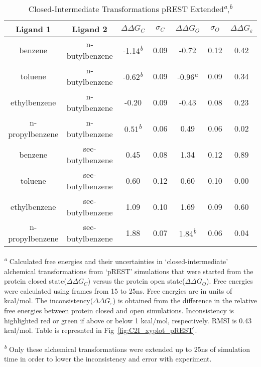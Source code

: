 \begin{table}[!htb]
\centering
\caption{Closed-Intermediate Transformations pREST Extended\textsuperscript{\emph{a}},\textsuperscript{\emph{b}}}
\label{tbl:C-I_pRESText}
\begin{tabular}{|c|c|c|c|c|c|c|}
\hline
\textbf{Ligand 1}       & \textbf{Ligand 2}    & \boldmath$\Delta\Delta G_{C}$ & \boldmath$\sigma_{C}$ & \boldmath$\Delta\Delta G_{O}$ & \boldmath$\sigma_{O}$ & \boldmath$\Delta\Delta G_{\varepsilon}$ \\ \hline
benzene          & n-butylbenzene   & -1.14\textsuperscript{\emph{b}}    & 0.09  & -0.72   & 0.12  & \cellcolor[HTML]{9AFF99}0.42 \\ \hline
toluene          & n-butylbenzene   & -0.62\textsuperscript{\emph{b}}    & 0.09  & -0.96\textsuperscript{\emph{a}}  & 0.09  & \cellcolor[HTML]{9AFF99}0.34 \\ \hline
ethylbenzene     & n-butylbenzene   & -0.20     & 0.09  & -0.43   & 0.08  & \cellcolor[HTML]{9AFF99}0.23 \\ \hline
n-propylbenzene  & n-butylbenzene   & 0.51\textsuperscript{\emph{b}}     & 0.06  & 0.49    & 0.06  & \cellcolor[HTML]{9AFF99}0.02 \\ \hline
benzene          & sec-butylbenzene & 0.45      & 0.08  & 1.34    & 0.12  & \cellcolor[HTML]{9AFF99}0.89 \\ \hline
toluene          & sec-butylbenzene & 0.60      & 0.12  & 0.60    & 0.10  & \cellcolor[HTML]{9AFF99}0.00 \\ \hline
ethylbenzene     & sec-butylbenzene & 1.09      & 0.10  & 1.69    & 0.09  & \cellcolor[HTML]{9AFF99}0.60 \\ \hline
n-propylbenzene  & sec-butylbenzene & 1.88      & 0.07  & 1.84\textsuperscript{\emph{b}}   & 0.06  & \cellcolor[HTML]{9AFF99}0.04 \\ \hline
\end{tabular}
 
\textsuperscript{\emph{a}} Calculated free energies and their uncertainties in `closed-intermediate' alchemical transformations from `pREST' simulations that were started from the protein closed state(\boldmath$\Delta\Delta G_{C}$) versus the protein open state(\boldmath$\Delta\Delta G_{O}$).
Free energies were calculated using frames from 15 to 25ns. 
Free energies are in units of kcal/mol.
The inconsistency(\boldmath$\Delta\Delta G_{\varepsilon}$) is obtained from the difference in the relative free energies between protein closed and open simulations. 
Inconsistency is highlighted red or green if above or below 1 kcal/mol, respectively.
RMSI is 0.43 kcal/mol.
Table is represnted in Fig~\ref{fig:C2I_xyplot_pREST}.

\textsuperscript{\emph{b}} Only these alchemical transformations were extended up to 25ns of simulation time in order to lower the inconsistency and error with experiment.
\end{table}


